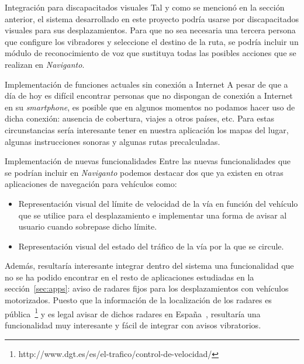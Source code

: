 \begin{definitionlist}
  \item[Integración para discapacitados visuales] Tal y como se mencionó en la sección anterior, el
    sistema desarrollado en este proyecto podría usarse por discapacitados visuales para sus
    desplazamientos. Para que no sea necesaria una tercera persona que configure los vibradores y
    seleccione el destino de la ruta, se podría incluir un módulo de reconocimiento de voz que
    sustituya todas las posibles acciones que se realizan en \emph{Naviganto}.

  \item[Implementación de funciones actuales sin conexión a Internet] A pesar de que a día de hoy es
    difícil encontrar personas que no dispongan de conexión a Internet en su \emph{smartphone}, es
    posible que en algunos momentos no podamos hacer uso de dicha conexión: ausencia de cobertura,
    viajes a otros países, etc. Para estas circunstancias sería interesante tener en nuestra
    aplicación los mapas del lugar, algunas instrucciones sonoras y algunas rutas precalculadas.

  \item[Implementación de nuevas funcionalidades] Entre las nuevas funcionalidades que se podrían
    incluir en \emph{Naviganto} podemos destacar dos que ya existen en otras aplicaciones de
    navegación para vehículos como:

    \begin{itemize}
      \item Representación visual del límite de velocidad de la vía en función del vehículo que se
        utilice para el desplazamiento e implementar una forma de avisar al usuario cuando sobrepase
        dicho límite.
      \item Representación visual del estado del tráfico de la vía por la que se circule.
    \end{itemize}

    Además, resultaría interesante integrar dentro del sistema una funcionalidad que no se ha podido
    encontrar en el resto de aplicaciones estudiadas en la sección~\ref{sec:apps}: aviso de radares
    fijos para los desplazamientos con vehículos motorizados. Puesto que la información de la
    localización de los radares es
    pública~\footnote{http://www.dgt.es/es/el-trafico/control-de-velocidad/} y es legal avisar de
    dichos radares en España~\cite{Arias14}, resultaría una funcionalidad muy interesante y fácil de
    integrar con avisos vibratorios.


\end{definitionlist}

